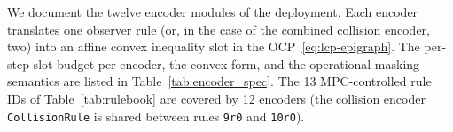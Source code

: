 
We document the twelve encoder modules of the deployment. Each encoder translates one observer rule (or, in the case of the combined collision encoder, two) into an affine convex inequality slot in the OCP~\eqref{eq:lcp-epigraph}. The per-step slot budget per encoder, the convex form, and the operational masking semantics are listed in Table~\ref{tab:encoder_spec}. The 13 MPC-controlled rule IDs of Table~\ref{tab:rulebook} are covered by 12 encoders (the collision encoder \texttt{CollisionRule} is shared between rules \texttt{9r0} and \texttt{10r0}).

